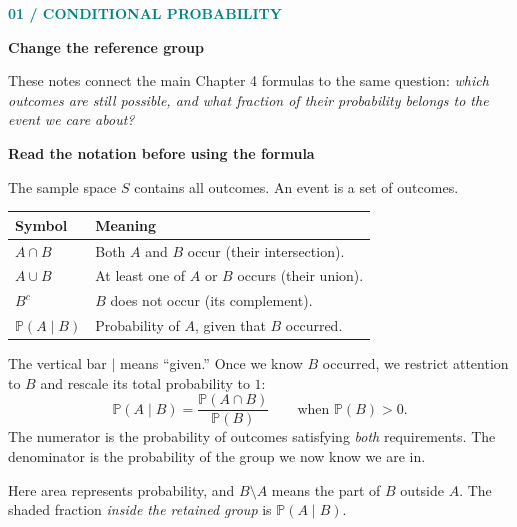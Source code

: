 \documentclass[11pt,letterpaper]{article}
\newcommand{\Pp}{\mathbb{P}}
\newcommand{\sectionpage}[2]{\textcolor{teal}{\small\textbf{#1}}\par{\LARGE\bfseries\color{ink}#2}\par\medskip}
\newcommand{\minihead}[1]{\par\smallskip\textbf{\color{ink}#1}\par}
\begin{document}
\sectionpage{01 / CONDITIONAL PROBABILITY}{Change the reference group}
These notes connect the main Chapter 4 formulas to the same question: \emph{which outcomes are still possible, and what fraction of their probability belongs to the event we care about?}

\minihead{Read the notation before using the formula}
The sample space $S$ contains all outcomes. An event is a set of outcomes.
\begin{center}
\begin{tabular}{@{}ll@{}}\toprule
Symbol & Meaning \\\midrule
$A\cap B$ & Both $A$ and $B$ occur (their intersection).\\
$A\cup B$ & At least one of $A$ or $B$ occurs (their union).\\
$B^c$ & $B$ does not occur (its complement).\\
$\Pp(A\mid B)$ & Probability of $A$, given that $B$ occurred.\\\bottomrule
\end{tabular}
\end{center}
The vertical bar $\mid$ means ``given.'' Once we know $B$ occurred, we restrict attention to $B$ and rescale its total probability to $1$:
\[
\boxed{\Pp(A\mid B)=\frac{\Pp(A\cap B)}{\Pp(B)}}\qquad\text{when }\Pp(B)>0.
\]
The numerator is the probability of outcomes satisfying \emph{both} requirements. The denominator is the probability of the group we now know we are in.

\begin{center}
\end{center}
Here area represents probability, and $B\setminus A$ means the part of $B$ outside $A$. The shaded fraction \emph{inside the retained group} is $\Pp(A\mid B)$.
\end{document}
